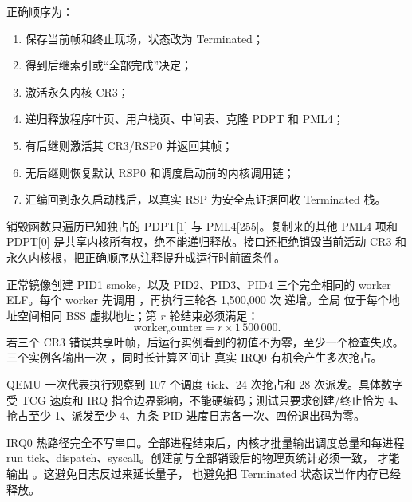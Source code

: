 正确顺序为：

\begin{enumerate}[label=\arabic*.]
  \item 保存当前帧和终止现场，状态改为 Terminated；
  \item 得到后继索引或“全部完成”决定；
  \item 激活永久内核 CR3；
  \item 递归释放程序叶页、用户栈页、中间表、克隆 PDPT 和 PML4；
  \item 有后继则激活其 CR3/RSP0 并返回其帧；
  \item 无后继则恢复默认 RSP0 和调度启动前的内核调用链；
  \item 汇编回到永久启动栈后，以真实 RSP 为安全点证据回收 Terminated 栈。
\end{enumerate}

销毁函数只遍历已知独占的 PDPT[1] 与 PML4[255]。复制来的其他 PML4 项和
PDPT[0] 是共享内核所有权，绝不能递归释放。接口还拒绝销毁当前活动 CR3 和
永久内核根，把正确顺序从注释提升成运行时前置条件。

正常镜像创建 PID1 smoke，以及 PID2、PID3、PID4 三个完全相同的 worker
ELF。每个 worker 先调用 ，再执行三轮各 1,500,000 次
递增。全局  位于每个地址空间相同 BSS 虚拟地址；第
\(r\) 轮结束必须满足：
\[
  \mathrm{worker_counter}=r\times1\,500\,000.
\]
若三个 CR3 错误共享叶帧，后运行实例看到的初值不为零，至少一个检查失败。
三个实例各输出一次 ，同时长计算区间让
真实 IRQ0 有机会产生多次抢占。

QEMU 一次代表执行观察到 107 个调度 tick、24 次抢占和 28 次派发。具体数字
受 TCG 速度和 IRQ 指令边界影响，不能硬编码；测试只要求创建/终止恰为 4、
抢占至少 1、派发至少 4、九条 PID 进度日志各一次、四份退出码为零。

IRQ0 热路径完全不写串口。全部进程结束后，内核才批量输出调度总量和每进程
run tick、dispatch、syscall。创建前与全部销毁后的物理页统计必须一致，
才能输出 。这避免日志反过来延长量子，
也避免把 Terminated 状态误当作内存已经释放。
